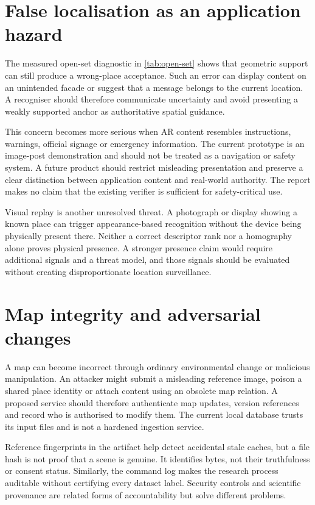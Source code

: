 \section{False localisation as an application hazard}
The measured open-set diagnostic in \cref{tab:open-set} shows that geometric support can still produce a wrong-place acceptance. Such an error can display content on an unintended facade or suggest that a message belongs to the current location. A recogniser should therefore communicate uncertainty and avoid presenting a weakly supported anchor as authoritative spatial guidance.

This concern becomes more serious when AR content resembles instructions, warnings, official signage or emergency information. The current prototype is an image-post demonstration and should not be treated as a navigation or safety system. A future product should restrict misleading presentation and preserve a clear distinction between application content and real-world authority. The report makes no claim that the existing verifier is sufficient for safety-critical use.

Visual replay is another unresolved threat. A photograph or display showing a known place can trigger appearance-based recognition without the device being physically present there. Neither a correct descriptor rank nor a homography alone proves physical presence. A stronger presence claim would require additional signals and a threat model, and those signals should be evaluated without creating disproportionate location surveillance.

\ifFullReport
\section{Map integrity and adversarial changes}
A map can become incorrect through ordinary environmental change or malicious manipulation. An attacker might submit a misleading reference image, poison a shared place identity or attach content using an obsolete map relation. A proposed service should therefore authenticate map updates, version references and record who is authorised to modify them. The current local database trusts its input files and is not a hardened ingestion service.

Reference fingerprints in the artifact help detect accidental stale caches, but a file hash is not proof that a scene is genuine. It identifies bytes, not their truthfulness or consent status. Similarly, the command log makes the research process auditable without certifying every dataset label. Security controls and scientific provenance are related forms of accountability but solve different problems.
\fi

